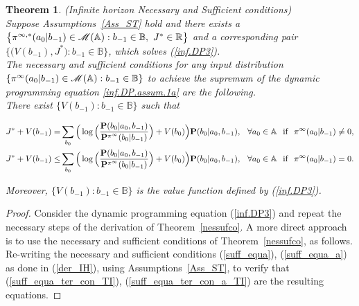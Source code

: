 \documentclass[11pt, a4paper, journal,onecolumn]{IEEEtran}
\newcommand{\mb}{\mathbb}
\newcommand{\hso}{\hspace{.1in}}
\newtheorem{theorem}{Theorem}[section]
\begin{document}
\begin{theorem}(Infinite horizon Necessary and Sufficient conditions)\\
\label{nessufco_ΙΗ}
Suppose Assumptions~\ref{Ass_ST} hold
and there exists a $\big\{\pi^{\infty,*}(a_0|b_{-1}) \in {\cal M}({\mb A}): b_{-1}  \in {\mb B}, \ J^*\in \mathbb{R}\big\}$ and a corresponding pair $\Big\{\Big(V(b_{-1}), J^*\Big): b_{-1} \in {\mb B}\Big\}$, which solves (\ref{inf.DP3}).\\
 The necessary and sufficient conditions for any input distribution $\{\pi^{\infty}(a_0|b_{-1}) \in {\cal M}({\mb A}): b_{-1} \in {\mb B} \}$ to achieve the supremum of the dynamic programming equation \eqref{inf.DP.assum.1a}  are the following.\\  There exist $\{V(b_{-1}): b_{-1} \in {\mb B}\}$ such that 

\begin{align}
J^* + V(b_{-1}) =& \sum_{b_{0}}\Big( \log\Big(\frac{{\bf P}(b_0|a_0,b_{-1})}{{\bf P}^{\pi^{\infty}}(b_0|b_{-1})}\Big)+V(b_{0}) \Big) {\bf P}(b_0|a_0,b_{-1}) , \hso   \forall{a_0}\in{\mb A}\hso \mbox{if} \hso \pi^{\infty}(a_0|b_{-1})\neq{0},  \label{suff_equa_ter_con_TI}\\
J^*+ V(b_{-1}) \leq & \sum_{b_{0}} \Big( \log\Big(\frac{{\bf P}(b_0|a_0,b_{-1})}{{\bf P}^{\pi^{\infty}}(b_0|b_{-1})}\Big) + V(b_0)\Big){\bf P}(b_0|a_0,b_{-1}), \hso   \forall{a_0}\in{\mb A} \hso \mbox{if} \hso \pi^{\infty}(a_0|b_{-1})={0} . \label{suff_equa_ter_con_a_TI}
\end{align}

 Moreover, $\{V(b_{-1}): b_{-1}\in {\mb B}\}$ is the value function  defined by (\ref{inf.DP3}).
\end{theorem}
\begin{proof} Consider the dynamic programming equation  (\ref{inf.DP3}) and  repeat the necessary steps of the derivation of Theorem~\ref{nessufco}. A more direct approach is to use the necessary and sufficient conditions of Theorem~\ref{nessufco}, as follows. Re-writing the necessary and sufficient conditions   (\ref{suff_equa}), (\ref{suff_equa_a}) as done in  (\ref{der_IH}),  using  Assumptions~\ref{Ass_ST}, to verify  that (\ref{suff_equa_ter_con_TI}), (\ref{suff_equa_ter_con_a_TI}) are the  resulting equations.    
\end{proof}
\end{document}
